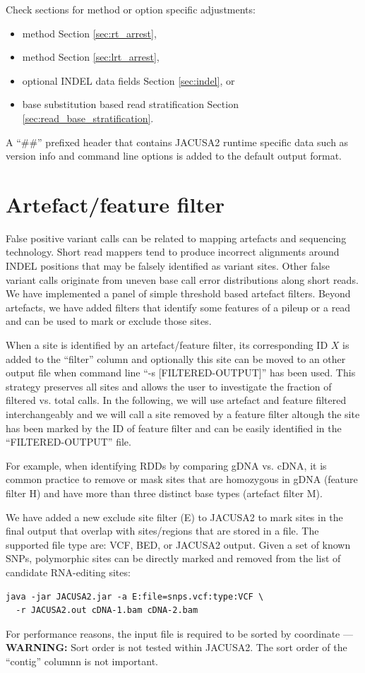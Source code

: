 \documentclass[10pt,a4paper,final]{article}
\begin{document}
Check sections for method or option specific adjustments:
\begin{itemize}
  \item \rtarrest method Section \ref{sec:rt_arrest},
  \item \lrtarrest method Section \ref{sec:lrt_arrest},
  \item optional INDEL data fields Section \ref{sec:indel}, or
  \item base substitution based read stratification Section \ref{sec:read_base_stratification}.
\end{itemize}

A ``\#\#'' prefixed header that contains JACUSA2 runtime specific data such as version info and
command line options is added to the default output format.
\section{Artefact/feature filter}\label{sec:artefact_filter}
False positive variant calls can be related to mapping artefacts and sequencing technology.
Short read mappers tend to produce incorrect alignments around INDEL positions that may be falsely 
identified as variant sites.
Other false variant calls originate from uneven base call error distributions along short reads.
We have implemented a panel of simple threshold based artefact filters. Beyond artefacts, we have 
added filters that identify some features of a pileup or a read and can be used to mark or exclude 
those sites.

When a site is identified by an artefact/feature filter, its corresponding ID $X$ is added to the
``filter'' column and optionally this site can be moved to an other output file when command
line ``-s [FILTERED-OUTPUT]'' has been used. This strategy preserves all sites and allows the user
to investigate the fraction of filtered vs. total calls. In the following, we will use artefact and
feature filtered interchangeably and we will call a site removed by a feature filter altough the site
has been marked by the ID of feature filter and can be easily identified in the ``FILTERED-OUTPUT'' file.

For example, when identifying RDDs by comparing gDNA vs. cDNA, it is common practice to remove or
mask sites that are homozygous in gDNA (feature filter H) and have more than three distinct base
types (artefact filter M).

We have added a new exclude site filter (E) to JACUSA2 to mark sites in the final output that overlap 
with sites/regions that are stored in a file. The supported file type are: VCF, BED, 
or JACUSA2 output. Given a set of known SNPs, polymorphic sites can be directly marked and removed 
from the list of candidate RNA-editing sites:
\begin{verbatim}
java -jar JACUSA2.jar -a E:file=snps.vcf:type:VCF \
  -r JACUSA2.out cDNA-1.bam cDNA-2.bam
\end{verbatim}
For performance reasons, the input file is required to be sorted by coordinate --- \textbf{WARNING:} 
Sort order is not tested within JACUSA2. The sort order of the ``contig'' columnn is not important.
\end{document}
